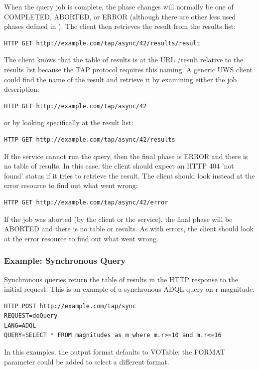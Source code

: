\documentclass[11pt,letter]{ivoa}
\begin{document}
When the query job is complete, the phase changes will normally be one of 
COMPLETED, ABORTED, or ERROR (although there are other less used phases defined 
in \citep{std:UWS}). The client then retrieves the result from the results list:
\begin{verbatim}
HTTP GET http://example.com/tap/async/42/results/result
\end{verbatim}
The client knows that the table of results is at the URL /result relative to the 
results list because the TAP protocol requires this naming. A generic UWS client 
could find the name of the result and retrieve it by examining either the job 
description:
\begin{verbatim}
HTTP GET http://example.com/tap/async/42
\end{verbatim}
or by looking specifically at the result list:
\begin{verbatim}
HTTP GET http://example.com/tap/async/42/results
\end{verbatim}
If the service cannot run the query, then the final phase is ERROR and there is 
no table of results. In this case, the client should expect an HTTP 404 'not 
found' status if it tries to retrieve the result. The client should look instead 
at the error resource to find out what went wrong:
\begin{verbatim}
HTTP GET http://example.com/tap/async/42/error
\end{verbatim}
If the job was aborted (by the client or the service), the final phase will be 
ABORTED and there is no table or results. As with errors, the client should look 
at the error resource to find out what went wrong.

\subsubsection{Example: Synchronous Query}

Synchronous queries return the table of results in the HTTP response to the 
initial request. This is an example of a synchronous ADQL query on r magnitude:

\begin{verbatim}
HTTP POST http://example.com/tap/sync
REQUEST=doQuery
LANG=ADQL
QUERY=SELECT * FROM magnitudes as m where m.r>=10 and m.r<=16
\end{verbatim}

In this examples, the output format defaults to VOTable; 
the FORMAT parameter could be added to select a different format.
\end{document}
